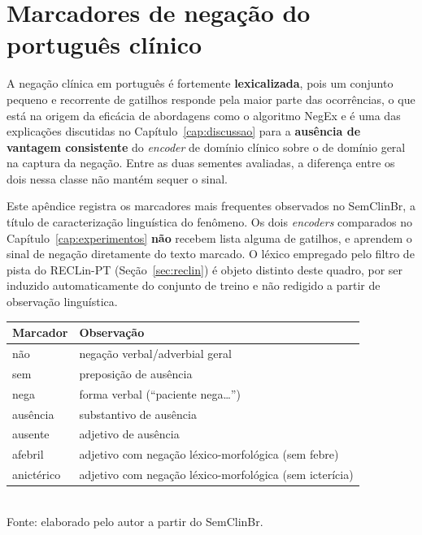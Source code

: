 \chapter[Marcadores de negação do português clínico]{Marcadores de negação do português clínico}
\label{ap:lexico}

A negação clínica em português é fortemente \textbf{lexicalizada}, pois um conjunto
pequeno e recorrente de gatilhos responde pela maior parte das ocorrências, o que
está na origem da eficácia de abordagens como o algoritmo NegEx
\cite{chapman_2001_negex} e é uma das explicações discutidas no
Capítulo~\ref{cap:discussao} para a \textbf{ausência de vantagem consistente} do
\emph{encoder} de domínio clínico sobre o de domínio geral na captura da negação.
Entre as duas sementes avaliadas, a diferença entre os dois nessa classe não
mantém sequer o sinal.

Este apêndice registra os marcadores mais frequentes observados no SemClinBr, a
título de caracterização linguística do fenômeno. Os dois \emph{encoders}
comparados no Capítulo~\ref{cap:experimentos} \textbf{não} recebem lista alguma de
gatilhos, e aprendem o sinal de negação diretamente do texto marcado. O léxico
empregado pelo filtro de pista do RECLin-PT (Seção~\ref{sec:reclin}) é objeto
distinto deste quadro, por ser induzido automaticamente do conjunto de treino e não
redigido a partir de observação linguística.

\begin{quadro}[htbp]
  \centering
  \caption{Marcadores de negação recorrentes no português clínico.}
  \label{quad:lexico}
  \begin{tabular}{ll}
  \toprule
  Marcador & Observação \\
  \midrule
  não       & negação verbal/adverbial geral \\
  sem       & preposição de ausência \\
  nega      & forma verbal (``paciente nega\ldots'') \\
  ausência  & substantivo de ausência \\
  ausente   & adjetivo de ausência \\
  afebril   & adjetivo com negação léxico-morfológica (sem febre) \\
  anictérico & adjetivo com negação léxico-morfológica (sem icterícia) \\
  \bottomrule
  \end{tabular}\\[4pt]
  {\footnotesize Fonte: elaborado pelo autor a partir do SemClinBr.}
\end{quadro}

